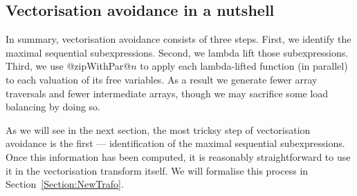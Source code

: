 \subsection{Vectorisation avoidance in a nutshell}

In summary, vectorisation avoidance consists of three steps. First, we identify the maximal sequential subexpressions. Second, we lambda lift those subexpressions. Third, we use @zipWithPar@$n$ to apply each lambda-lifted function (in parallel) to each valuation of its free variables. As a result we generate fewer array traversals and fewer intermediate arrays, though we may sacrifice some load balancing by doing so.

As we will see in the next section, the most tricksy step of vectorisation avoidance is the first --- identification of the maximal sequential subexpressions. Once this information has been computed, it is reasonably straightforward to use it in the vectorisation transform itself. We will formalise this process in Section~\ref{Section:NewTrafo}.

